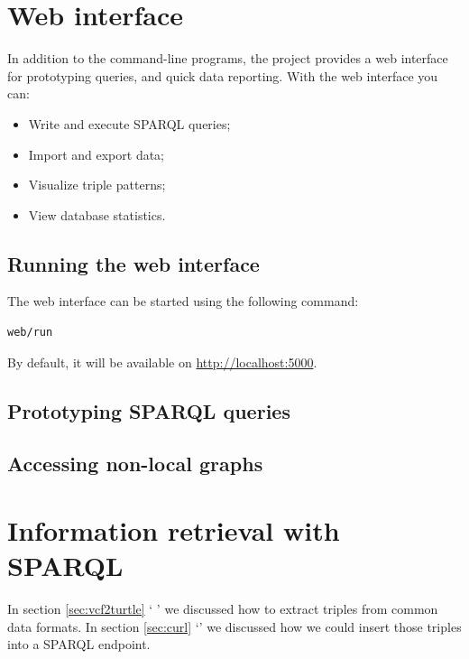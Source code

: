 \documentclass[11pt,a4paper,oneside]{book}
\begin{document}
\chapter{Web interface}
\label{chap:web-interface}

  In addition to the command-line programs, the project provides a web
  interface for prototyping queries, and quick data reporting.  With the
  web interface you can:
  \begin{itemize}
  \item Write and execute SPARQL queries;
  \item Import and export data;
  \item Visualize triple patterns;
  \item View database statistics.
  \end{itemize}

\section{Running the web interface}

  The web interface can be started using the following command:

\begin{siderules}
\begin{verbatim}
web/run
\end{verbatim}
\end{siderules}

  By default, it will be available on \url{http://localhost:5000}.

\section{Prototyping SPARQL queries}

\section{Accessing non-local graphs}

\chapter{Information retrieval with SPARQL}

  In section \ref{sec:vcf2turtle} {\color{LinkGray}`%
  '} we discussed how to extract
  triples from common data formats.  In section \ref{sec:curl}
  {\color{LinkGray}`'} we discussed how we could insert
  those triples into a SPARQL endpoint.
\end{document}
